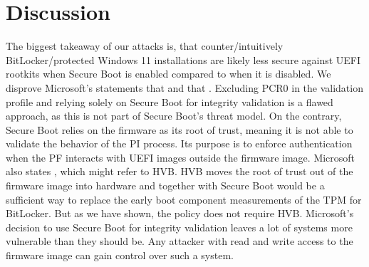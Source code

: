 


\chapter{Discussion}
\label{sec:discussion}

The biggest takeaway of our attacks is, that counter\-/intuitively BitLocker\-/protected Windows 11 installations are likely less secure against \ac{UEFI} rootkits when Secure Boot is enabled compared to when it is disabled.
We disprove Microsoft's statements that  and that .
Excluding \ac{PCR}0 in the validation profile and relying solely on Secure Boot for integrity validation is a flawed approach, as this is not part of Secure Boot's threat model.
On the contrary, Secure Boot relies on the firmware as its root of trust, meaning it is not able to validate the behavior of the \ac{PI} process.
Its purpose is to enforce authentication when the \ac{PF} interacts with \ac{UEFI} images outside the firmware image.
Microsoft also states , which might refer to \ac{HVB}.
\ac{HVB} moves the root of trust out of the firmware image into hardware and together with Secure Boot would be a sufficient way to replace the early boot component measurements of the \ac{TPM} for BitLocker.
But as we have shown, the policy does not require \ac{HVB}.
Microsoft's decision to use Secure Boot for integrity validation leaves a lot of systems more vulnerable than they should be.
Any attacker with read and write access to the firmware image can gain control over such a system.
